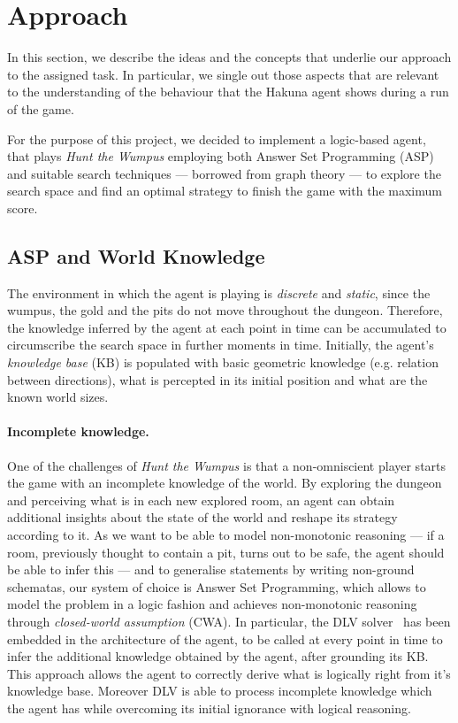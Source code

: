 \documentclass{llncs}
\newcommand{\htw}{\emph{Hunt the Wumpus }}
\begin{document}
\section{Approach}

In this section, we describe the ideas and the concepts that underlie our approach to the assigned task.
In particular, we single out those aspects that are relevant to the understanding of the behaviour that the Hakuna agent shows during a run of the game.

For the purpose of this project, we decided to implement a logic-based agent, that plays \htw employing both Answer Set Programming (ASP) and suitable search techniques --- borrowed from graph theory --- to explore the search space and find an optimal strategy to finish the game with the maximum score.

\subsection{ASP and World Knowledge}

The environment in which the agent is playing is \emph{discrete} and \emph{static}, since the wumpus, the gold and the pits do not move throughout the dungeon.
Therefore, the knowledge inferred by the agent at each point in time can be accumulated to circumscribe the search space in further moments in time.
Initially, the agent's \emph{knowledge base} (KB) is populated with basic geometric knowledge (e.g. relation between directions), what is percepted in its initial position and what are the known world sizes.

\paragraph{Incomplete knowledge.} One of the challenges of \htw is that a non-omniscient player starts the game with an incomplete knowledge of the world.
By exploring the dungeon and perceiving what is in each new explored room, an agent can obtain additional insights about the state of the world and reshape its strategy according to it.
As we want to be able to model non-monotonic reasoning --- if a room, previously thought to contain a pit, turns out to be safe, the agent should be able to infer this --- and to generalise statements by writing non-ground schematas, our system of choice is Answer Set Programming, which allows to model the problem in a logic fashion and achieves non-monotonic reasoning through \emph{closed-world assumption} (CWA).
In particular, the DLV solver~\cite{DLV-system} has been embedded in the architecture of the agent, to be called at every point in time to infer the additional knowledge obtained by the agent, after grounding its KB.
This approach allows the agent to correctly derive what is logically right from it's knowledge base. Moreover DLV is able to process incomplete knowledge which the agent has while overcoming its initial ignorance with logical reasoning.
\end{document}
